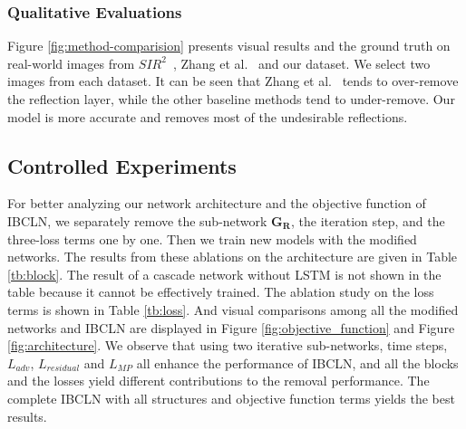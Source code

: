 \documentclass[10pt,twocolumn,letterpaper]{article}
\begin{document}
\vspace{-0.5em}
\subsubsection{Qualitative Evaluations}
Figure \ref{fig:method-comparision} presents visual results and the ground truth on real-world images from $SIR^2$~\cite{wan2017benchmarking}, Zhang et al.~\cite{zhang2018single} and our dataset. We select two images from each dataset. It can be seen that Zhang et al.~\cite{zhang2018single} tends to over-remove the reflection layer, while the other baseline methods tend to under-remove. Our model is more accurate and removes most of the undesirable reflections.

\vspace{-0.2em}
\subsection{Controlled Experiments}
For better analyzing our network architecture and the objective function of IBCLN, we separately remove the sub-network $\bm{G_R}$, the iteration step, and the three-loss terms one by one. Then we train new models with the modified networks. The results from these ablations on the architecture are given in Table \ref{tb:block}. The result of a cascade network without LSTM is not shown in the table because it cannot be effectively trained. The ablation study on the loss terms is shown in Table \ref{tb:loss}. And visual comparisons among all the modified networks and IBCLN are displayed in Figure \ref{fig:objective_function} and Figure \ref{fig:architecture}. We observe that using two iterative sub-networks, time steps, $L_{adv}$, $L_{residual}$ and $L_{MP}$ all enhance the performance of IBCLN, and all the blocks and the losses yield different contributions to the removal performance. The complete IBCLN with all structures and objective function terms yields the best results.
\end{document}
